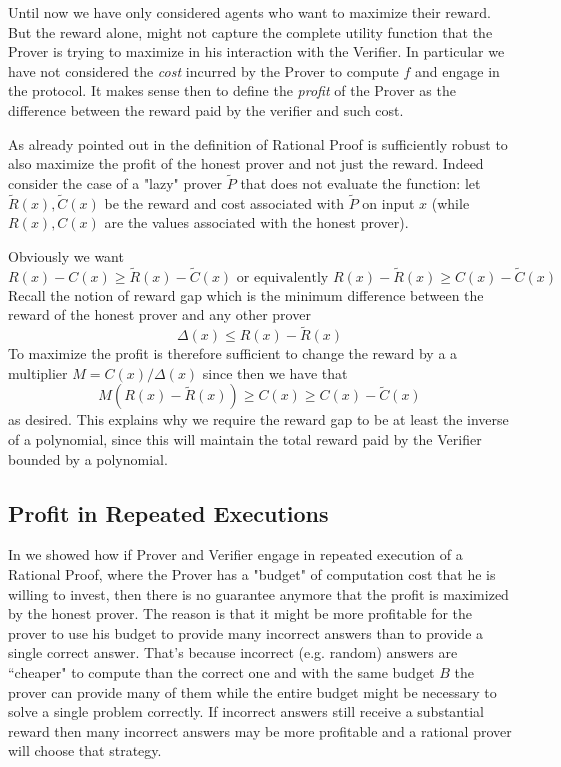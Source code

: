 Until now we have only considered agents who want to maximize their reward. But the reward alone, might not capture the complete utility function that the Prover is trying to maximize in his interaction with the Verifier. In particular we have not considered the 
{\em cost} incurred by the Prover to compute $f$ and engage in the protocol. It makes 
sense then to define the  {\em profit} of the Prover as the difference between the reward paid by the verifier and such cost. 


As already pointed out in \cite{am1,ratargs} the definition of Rational Proof is sufficiently robust to also maximize the profit of the honest prover and not just the reward. Indeed consider the case of a "lazy" prover $\tilde{P}$ that does not evaluate the function: let $\tilde{R}(x), \tilde{C}(x)$ be the reward and cost associated with $\tilde{P}$ on input $x$ (while $R(x),C(x)$ are the values associated with the honest prover). 

Obviously we want
\[ R(x)-C(x) \geq \tilde{R}(x)-\tilde{C}(x) \mbox{ or equivalently } 
R(x)-\tilde{R}(x) \geq C(x) - \tilde{C}(x) \]
Recall the notion of reward gap which is the minimum difference between the reward of the honest prover and any other prover
\[ \Delta(x) \leq R(x)-\tilde{R}(x) \]
To maximize the profit is therefore sufficient to change the reward by a 
a multiplier $M= C(x)/\Delta(x)$ since then we have that 
\[ M(R(x) - \tilde{R}(x)) \geq C(x) \geq C(x) - \tilde{C}(x) \]
as desired. This explains why we require the reward gap to be at least the inverse of a polynomial, since this will maintain the total reward paid by the Verifier bounded by a polynomial. 

\subsection{Profit in Repeated Executions}

In \cite{cg15} we showed how if Prover and Verifier engage in repeated execution of a Rational Proof, where the Prover has a "budget" of computation cost that he is willing to invest, then there is no guarantee anymore that the profit is maximized by the honest prover. The reason is that it might be more profitable for the prover to use his budget to provide many incorrect answers than to provide a single correct answer. That's because incorrect (e.g. random) answers are ``cheaper" to compute than the correct one and with the same budget $B$ the prover can provide many of them while the entire budget might be necessary to solve a single problem correctly. If incorrect answers still receive a substantial reward then many incorrect answers may be more profitable and a rational prover will choose that strategy. 

